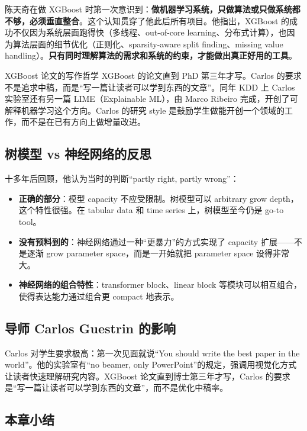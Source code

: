 \documentclass[a4paper]{article}
\begin{document}
陈天奇在做 XGBoost 时第一次意识到：\textbf{做机器学习系统，只做算法或只做系统都不够，必须垂直整合}。这个认知贯穿了他此后所有项目。他指出，XGBoost 的成功不仅因为系统层面跑得快（多线程、out-of-core learning、分布式计算），也因为算法层面的细节优化（正则化、sparsity-aware split finding、missing value handling）。\textbf{只有同时理解算法的需求和系统的约束，才能做出真正好用的工具}。

\begin{knowledgebox}{XGBoost 论文的写作哲学}
XGBoost 的论文直到 PhD 第三年才写。Carlos 的要求不是追求中稿，而是``写一篇让读者可以学到东西的文章''。同年 KDD 上 Carlos 实验室还有另一篇 LIME（Explainable ML），由 Marco Ribeiro 完成，开创了可解释机器学习这个方向。Carlos 的研究 style 是鼓励学生做能开创一个领域的工作，而不是在已有方向上做增量改进。
\end{knowledgebox}

\subsection{树模型 vs 神经网络的反思}

十多年后回顾，他认为当时的判断``partly right, partly wrong''：

\begin{itemize}
    \item \textbf{正确的部分}：模型 capacity 不应受限制。树模型可以 arbitrary grow depth，这个特性很强。在 tabular data 和 time series 上，树模型至今仍是 go-to tool。
    \item \textbf{没有预料到的}：神经网络通过一种``更暴力''的方式实现了 capacity 扩展------不是逐渐 grow parameter space，而是一开始就把 parameter space 设得非常大。
    \item \textbf{神经网络的组合特性}：transformer block、linear block 等模块可以相互组合，使得表达能力通过组合更 compact 地表示。
\end{itemize}

\subsection{导师 Carlos Guestrin 的影响}

Carlos 对学生要求极高：第一次见面就说``You should write the best paper in the world''。他的实验室有``no beamer, only PowerPoint''的规定，强调用视觉化方式让读者快速理解研究内容。XGBoost 论文直到博士第三年才写，Carlos 的要求是``写一篇让读者可以学到东西的文章''，而不是优化中稿率。

\subsection{本章小结}
\end{document}
